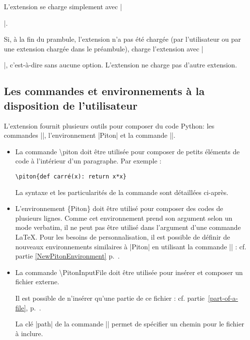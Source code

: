 \documentclass[dvipsnames,svgnames]{article}
\begin{document}
L'extension  se charge simplement avec |\usepackage{piton}|.

\smallskip
Si, à la fin du prambule, l'extension  n'a pas été chargée (par l'utilisateur ou par une extension
chargée dans le préambule),  charge l'extension  avec |\usepackage{xcolor}|, c'est-à-dire
sans aucune option. L'extension  ne charge pas d'autre extension.

\subsection{Les commandes et environnements à la disposition de l'utilisateur}


L'extension  fournit plusieurs outils pour composer du code Python: les commandes |\piton|,
l'environnement |{Piton}| et la commande |\PitonInputFile|. 

\begin{itemize} \setlength{\fboxsep}{1pt}
\item La commande \colorbox{gray!20}{\ttfamily \textbackslash piton} doit être utilisée pour composer de petits éléments de code à l'intérieur d'un
paragraphe. Par exemple : 

{\color{gray}\verb|\piton{def carré(x): return x*x}|}\qquad 
{}

La syntaxe et les particularités de la commande sont détaillées ci-après.


\item L'environnement \colorbox{gray!20}{\ttfamily \{Piton\}} doit être utilisé pour composer des codes de
plusieurs lignes. Comme cet environnement prend son argument selon un mode verbatim, il ne peut pas être utilisé
dans l'argument d'une commande LaTeX. Pour les besoins de personnalisation, il est possible de définir de nouveaux
environnements similaires à |{Piton}| en utilisant la commande |\NewPitonEnvironment| : cf. partie
\ref{NewPitonEnvironment} p.~\pageref{NewPitonEnvironment}.

\item La commande \colorbox{gray!20}{\ttfamily \textbackslash PitonInputFile} doit être utilisée pour insérer et
composer un fichier externe.

Il est possible de n'insérer qu'une partie de ce fichier : cf. partie~\ref{part-of-a-file},
p.~\pageref{part-of-a-file}.

La clé |path| de la commande |\PitonOptions| permet de spécifier un chemin pour le fichier à inclure. 
\end{itemize}
\end{document}
